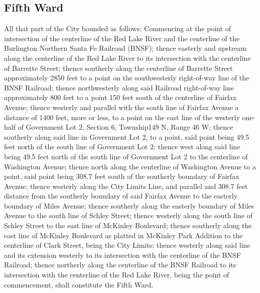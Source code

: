 \subsection{Fifth Ward}
All that part of the City bounded as follows:  Commencing at the point of intersection of the centerline of the Red Lake River and the centerline of the Burlington Northern Santa Fe Railroad (BNSF); thence easterly and upstream along the centerline of the Red Lake River to its intersection with the centerline of Barrette Street; thence southerly along the centerline of Barrette Street approximately 2850 feet to a point on the southwesterly right-of-way line of the BNSF Railroad; thence northwesterly along said Railroad right-of-way line approximately 800 feet to a point 150 feet south of the centerline of Fairfax Avenue; thence westerly and parallel with the south line of Fairfax Avenue a distance of 1400 feet, more or less, to a point on the east line of the westerly one-half of Government Lot 2, Section 6, Township149 N, Range 46 W; thence southerly along said line in Government Lot 2, to a point, said point being 49.5 feet north of the south line of Government Lot 2; thence west along said line being 49.5 feet north of the south line of Government Lot 2 to the centerline of Washington Avenue; thence north along the centerline of Washington Avenue to a point, said point being 308.7 feet south of the southerly boundary of Fairfax Avenue; thence westerly along the City Limits Line, and parallel and 308.7 feet distance from the southerly boundary of said Fairfax Avenue to the easterly boundary of Miles Avenue; thence southerly along the easterly boundary of Miles Avenue to the  south line of Schley Street; thence westerly along the south line of Schley Street to the east line of McKinley Boulevard; thence southerly along the east line of McKinley Boulevard as platted in McKinley Park Addition to the centerline of Clark Street, being the City Limits; thence westerly along said line and its extension westerly to its intersection with the centerline of the  BNSF Railroad; thence northerly along the centerline of the BNSF Railroad to its intersection with the centerline of the Red Lake River, being the point of commencement, shall constitute the Fifth Ward.

